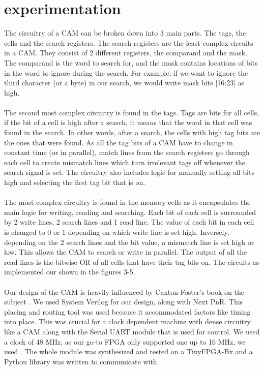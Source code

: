 \section{experimentation}
The circuitry of a CAM can be broken down into 3 main parts. The tags, the cells and the search registers. 
The search registers are the least complex circuits in a CAM. They consist of 2 different registers, the comparand and the mask. 
The comparand is the word to search for, and the mask contains locations of bits in the word to ignore during the search.
For example, if we want to ignore the third character (or a byte) in our search, we would write mask bits [16:23] as high.
\\\\
The second most complex circuitry is found in the tags.
Tags are bits for all cells, if the bit of a cell is high after a search, it means that the word in that cell was found in the search. 
In other words, after a search, the cells with high tag bits are the ones that were found. 
As all the tag bits of a CAM have to change in constant time (or in parallel), match lines from the search registers go through each cell to create mismatch lines which turn irrelevant tags off whenever the search signal is set.
The circuitry also includes logic for manually setting all bits high and selecting the first tag bit that is on.
\\\\
The most complex circuitry is found in the memory cells as it encapsulates the main logic for writing, reading and searching. 
Each bit of each cell is surrounded by 2 write lines, 2 search lines and 1 read line. 
The value of each bit in each cell is changed to 0 or 1 depending on which write line is set high. 
Inversely, depending on the 2 search lines and the bit value, a mismatch line is set high or low. 
This allows the CAM to search or write in parallel. 
The output of all the read lines is the bitwise OR of all cells that have their tag bits on. 
The circuits as implemented our shown in the figures 3-5. 
\\\\
Our design of the CAM is heavily influenced by Caxton Foster's book on the subject \cite{capp}.
We used System Verilog for our design, along with Next PnR. 
This placing and routing tool was used because it accommodated factors like timing into place. 
This was crucial for a clock dependent machine with dense circuitry like a CAM along with the Serial UART module that is used for control. 
We used a clock of 48 MHz, as our go-to FPGA only supported one up to 16 MHz, we used . 
The whole module was synthesized and tested on a TinyFPGA-Bx and a Python library was written to communicate with